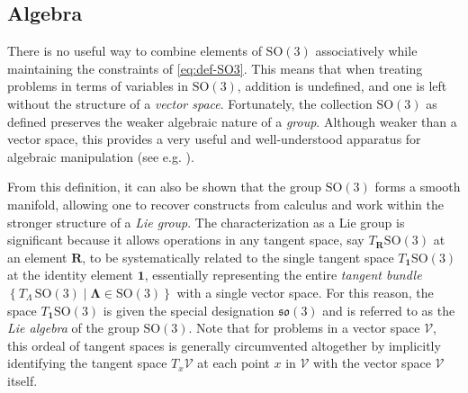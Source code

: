 \hypertarget{algebra}{%
\subsection{Algebra}\label{algebra}}

There is no useful way to combine elements of
\(\mathrm{SO}(3)\) associatively %
while maintaining the constraints of \eqref{eq:def-SO3}.
This means that when treating problems in terms of variables 
in \(\mathrm{SO}(3)\), addition is undefined, and one is left without the structure of a \emph{vector space}.
Fortunately, the collection \(\mathrm{SO}(3)\) as
defined preserves the weaker algebraic nature of a \emph{group}.
Although weaker than a vector space, this provides a very useful and
well-understood apparatus for algebraic manipulation (see e.g.
\cite{artin1991algebra}).

From this definition, it can also be shown that the group
\(\mathrm{SO}(3)\) forms a smooth manifold, allowing one to recover
constructs from calculus and work within the stronger structure of a
\emph{Lie group}.
The characterization as a Lie group is significant
because it allows operations in any tangent space, say
\(T_{\bm{R}}\mathrm{SO}(3)\) at an element \(\bm{R}\),
to be systematically related to the single tangent space
\(T_{\bm{1}}\mathrm{SO}(3)\) at the identity element \(\bm{1}\),
essentially representing the entire \emph{tangent bundle} \(\left\{T_{\scriptscriptstyle{\Lambda}}\,\mathrm{SO}(3)\mid \bm{\Lambda}\in\mathrm{SO}(3)\right\}\) %
with a single vector space.
For this reason, the space \(T_{\bm{1}}\mathrm{SO}(3)\)
is given the special designation \(\mathfrak{so}(3)\) and is referred to
as the \emph{Lie algebra} of the group \(\mathrm{SO}(3)\).
Note that for problems in a vector space \(\mathcal{V}\),
this ordeal of tangent spaces %
is generally circumvented altogether by implicitly
identifying the tangent space \(T_x\mathcal{V}\) at each point \(x\) in
\(\mathcal{V}\) with the vector space \(\mathcal{V}\) itself.


